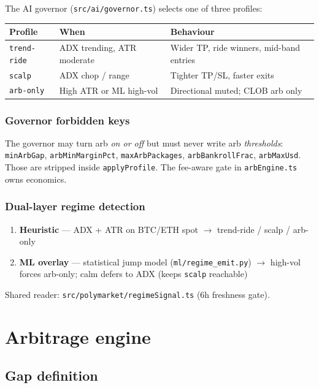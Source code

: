 \documentclass[11pt,a4paper]{report}
\begin{document}
The AI governor (\texttt{src/ai/governor.ts}) selects one of three profiles:

\begin{longtable}{@{}llp{7.5cm}@{}}
\toprule
Profile & When & Behaviour \\
\midrule
\endhead
\texttt{trend-ride} & ADX trending, ATR moderate & Wider TP, ride winners, mid-band entries \\
\texttt{scalp} & ADX chop / range & Tighter TP/SL, faster exits \\
\texttt{arb-only} & High ATR or ML high-vol & Directional muted; CLOB arb only \\
\bottomrule
\end{longtable}

\subsection{Governor forbidden keys}

The governor may turn arb \emph{on or off} but must never write arb \emph{thresholds}:
\texttt{minArbGap}, \texttt{arbMinMarginPct}, \texttt{maxArbPackages},
\texttt{arbBankrollFrac}, \texttt{arbMaxUsd}. Those are stripped inside
\texttt{applyProfile}. The fee-aware gate in \texttt{arbEngine.ts} owns economics.

\subsection{Dual-layer regime detection}

\begin{enumerate}
  \item \textbf{Heuristic} --- ADX + ATR on BTC/ETH spot $\rightarrow$ trend-ride / scalp / arb-only
  \item \textbf{ML overlay} --- statistical jump model (\texttt{ml/regime\_emit.py})
        $\rightarrow$ high-vol forces arb-only; calm defers to ADX (keeps \texttt{scalp} reachable)
\end{enumerate}

Shared reader: \texttt{src/polymarket/regimeSignal.ts} (6h freshness gate).

\chapter{Arbitrage engine}

\section{Gap definition}
\end{document}

